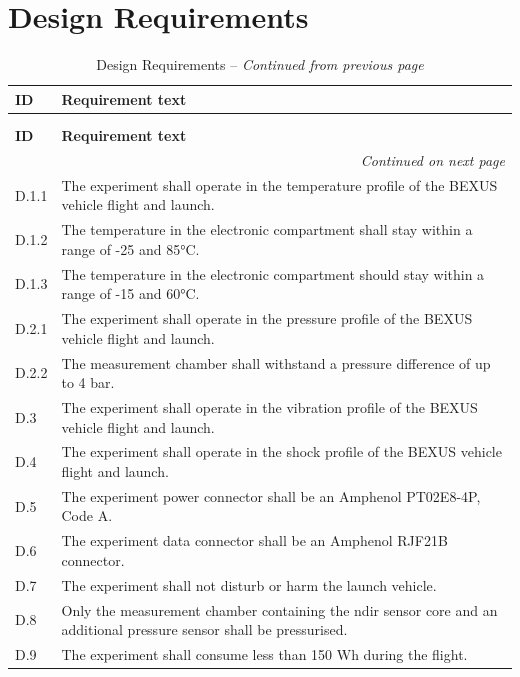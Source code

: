 \documentclass[
  a4paper,
  11pt,
  openany,
  parskip,
  toc=totoc,
  listof=totoc,
  bibliography=totoc
]{scrreprt}
\begin{document}
\section{Design Requirements}

\begin{longtable}{|p{2cm}|p{12cm}|}
\caption{Design Requirements} \\
\hline
\textbf{ID} & \textbf{Requirement text} \\
\hline
\endfirsthead
\caption[]{Design Requirements -- \textit{Continued from previous page}} \\
\label{tab:design_req}\\
\hline
\textbf{ID} & \textbf{Requirement text} \\
\hline
\endhead
\hline
\multicolumn{2}{r}{\textit{Continued on next page}} \\
\endfoot
\hline
\endlastfoot
D.1.1 & The experiment shall operate in the temperature profile of the BEXUS vehicle flight and launch. \\
\hline
D.1.2 & The temperature in the electronic compartment shall stay within a range of -25 and 85°C.\\
\hline
D.1.3 & The temperature in the electronic compartment should stay within a range of -15 and 60°C.\\
\hline
D.2.1 & The experiment shall operate in the pressure profile of the BEXUS vehicle flight and launch. \\
\hline
D.2.2 & The measurement chamber shall withstand a pressure difference of up to 4 bar. \\
\hline
D.3 & The experiment shall operate in the vibration profile of the BEXUS vehicle flight and launch. \\
\hline
D.4 & The experiment shall operate in the shock profile of the BEXUS vehicle flight and launch. \\
\hline
D.5 & The experiment power connector shall be an Amphenol PT02E8-4P, Code A.\\
\hline
D.6 & The experiment data connector shall be an Amphenol RJF21B connector. \\
\hline
D.7 & The experiment shall not disturb or harm the launch vehicle. \\
\hline
D.8 & Only the measurement chamber containing the \gls{ndir} sensor core and an additional pressure sensor shall be pressurised.\\
\hline
D.9 & The experiment shall consume less than 150 Wh during the flight. \\

\end{longtable}
\end{document}
